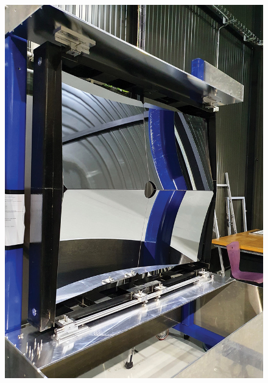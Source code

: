 \begin{frame}
    \begin{figure}[h]
        \centering
        \includegraphics[height=\textheight]{Figures Introductory Lecture/LHCb Detector/LHCb_RICH1.jpeg}%
        \end{figure}
\end{frame}
